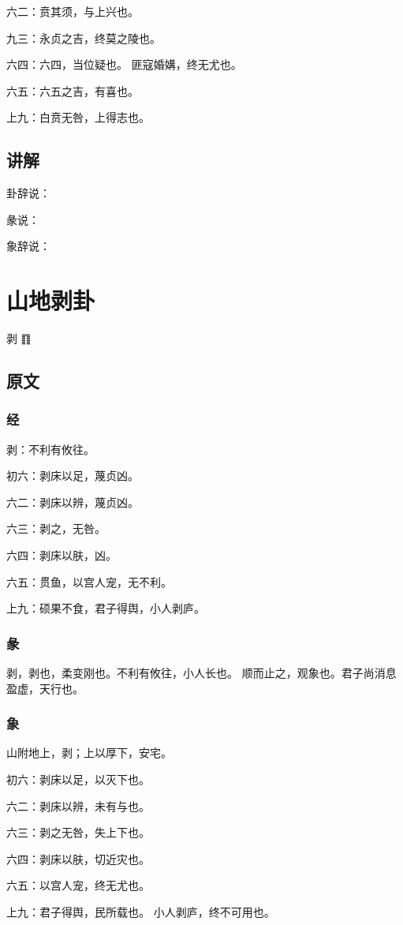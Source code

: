 \documentclass[12pt,oneside]{book}
\begin{document}
六二：贲其须，与上兴也。

九三：永贞之吉，终莫之陵也。

六四：六四，当位疑也。 匪寇婚媾，终无尤也。

六五：六五之吉，有喜也。

上九：白贲无咎，上得志也。

\section{讲解}
卦辞说：

彖说：

象辞说：


\chapter{山地剥卦}
剥 {\Large ䷖}

\section{原文}
\subsection{经}
剥：不利有攸往。

初六：剥床以足，蔑贞凶。

六二：剥床以辨，蔑贞凶。

六三：剥之，无咎。

六四：剥床以肤，凶。

六五：贯鱼，以宫人宠，无不利。

上九：硕果不食，君子得舆，小人剥庐。

\subsection{彖}
剥，剥也，柔变刚也。不利有攸往，小人长也。 顺而止之，观象也。君子尚消息盈虚，天行也。
\subsection{象}
山附地上，剥；上以厚下，安宅。

初六：剥床以足，以灭下也。

六二：剥床以辨，未有与也。

六三：剥之无咎，失上下也。

六四：剥床以肤，切近灾也。

六五：以宫人宠，终无尤也。

上九：君子得舆，民所载也。 小人剥庐，终不可用也。
\end{document}
